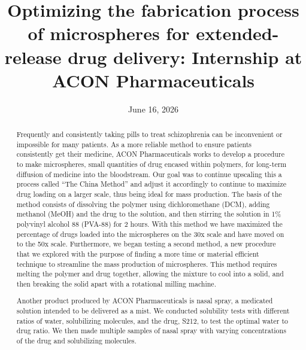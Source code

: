 ﻿\documentclass[12pt,conference,onecolumn]{IEEEtran}
\title{Optimizing the fabrication process of microspheres for extended-release drug delivery: Internship at ACON Pharmaceuticals}
\author{%
\IEEEauthorblockN{Emily Chen}\IEEEauthorblockA{Science \& Engineering\\Manalapan High School\\Englishtown, NJ\\\href{mailto:426echen@frhsd.com}{426echen@frhsd.com}}\and
\IEEEauthorblockN{Petra Rofman}\IEEEauthorblockA{Science \& Engineering\\Manalapan High School\\Englishtown, NJ\\\href{mailto:426profman@frhsd.com}{426profman@frhsd.com}}
}
\date{June 16, 2026}
\begin{document}
\maketitle 

\begin{abstract}
Frequently and consistently taking pills to treat schizophrenia can be inconvenient or impossible for many patients. As a more reliable method to ensure patients consistently get their medicine, ACON Pharmaceuticals works to develop a procedure to make microspheres, small quantities of drug encased within polymers, for long-term diffusion of medicine into the bloodstream. Our goal was to continue upscaling this a process called ``The China Method'' and adjust it accordingly to continue to maximize drug loading on a larger scale, thus being ideal for mass production. The basis of the method consists of dissolving the polymer using dichloromethane (DCM), adding methanol (MeOH) and the drug to the solution, and then stirring the solution in 1\% polyvinyl alcohol 88 (PVA-88) for 2 hours. With this method we have maximized the percentage of drugs loaded into the microspheres on the 30x scale and have moved on to the 50x scale. Furthermore, we began testing a second method, a new procedure that we explored with the purpose of finding a more time or material efficient technique to streamline the mass production of microspheres. This method requires melting the polymer and drug together, allowing the mixture to cool into a solid, and then breaking the solid apart with a rotational milling machine. 

Another product produced by ACON Pharmaceuticals is nasal spray, a medicated solution intended to be delivered as a mist. We conducted solubility tests with different ratios of water, solubilizing molecules, and the drug, S212, to test the optimal water to drug ratio. We then made multiple samples of nasal spray with varying concentrations of the drug and solubilizing molecules. 



\end{abstract}
\end{document}
